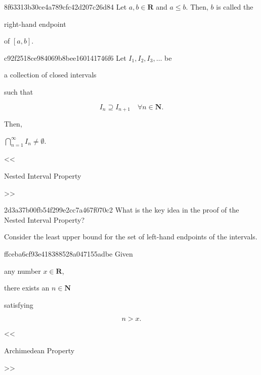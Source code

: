 \begin{note}{8f63313b30ce4a789cfc42d207c26d84}
    Let \({ a, b \in \mathbf{R} }\) and \({ a \leqslant b }\).
    Then, \({ b }\) is called the \begin{icloze}{1}right-hand endpoint\end{icloze} of \({ [a, b] }\).
\end{note}

\begin{note}{c92f2518ce984069b8bee160141746f6}
    Let \({ I_1, I_2, I_3, \ldots }\) be \begin{icloze}{2}a collection of closed intervals\end{icloze} such that
    \begin{icloze}{1}
        \[
            I_n \supseteq I_{n + 1} \quad \forall n \in \mathbf{N}.
        \]
    \end{icloze}
    Then, \begin{icloze}{3}\({ \bigcap_{n = 1}^{\infty} I_n \neq \emptyset }\).\end{icloze}

    \begin{center}
        \tiny
        <<\begin{icloze}{4}Nested Interval Property\end{icloze}>>
    \end{center}
\end{note}

\begin{note}{2d3a37b00fb54f299e2cc7a467f070c2}
    What is the key idea in the proof of the Nested Interval Property?

    \begin{cloze}{1}
        Consider the least upper bound for the set of left-hand endpoints of the intervals.
    \end{cloze}
\end{note}

\begin{note}{ffceba6cf93e418388528a047155adbe}
    Given \begin{icloze}{3}any number \({ x \in \mathbf{R} }\),\end{icloze} \begin{icloze}{2}there exists an \({ n \in \mathbf{N} }\)\end{icloze} satisfying
    \begin{icloze}{1}
        \[
            n > x.
        \]
    \end{icloze}

    \begin{center}
        \tiny
        <<\begin{icloze}{4}Archimedean Property\end{icloze}>>
    \end{center}
\end{note}


